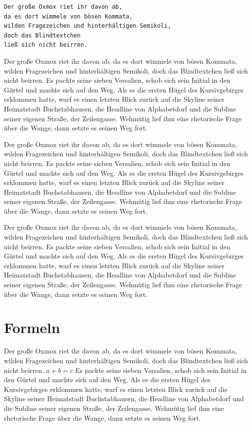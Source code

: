\documentclass[%
	12pt,%
	a4paper,%
	oneside,%
	liststotoc, idxtotoc, bibtotoc, %
	parskip=half,%
	nochapterprefix,%
	appendixprefix, %
	headings=small,%
]{scrreprt}
\newcommand{\alt}[1]{}%
\begin{document}
\begin{verbatim}
Der große Oxmox riet ihr davon ab,
da es dort wimmele von bösen Kommata,
wilden Fragezeichen und hinterhältigen Semikoli,
doch das Blindtextchen 
ließ sich nicht beirren.
\end{verbatim}

Der große Oxmox riet ihr davon ab, da es dort wimmele von bösen Kommata, wilden Fragezeichen und hinterhältigen Semikoli, doch das Blindtextchen ließ sich nicht beirren. Es packte seine sieben Versalien, schob sich sein Initial in den Gürtel und machte sich auf den Weg. Als es die ersten Hügel des Kursivgebirges erklommen hatte, warf es einen letzten Blick zurück auf die Skyline seiner Heimatstadt Buchstabhausen, die Headline von Alphabetdorf und die Subline seiner eigenen Straße, der Zeilengasse. Wehmütig lief ihm eine rhetorische Frage über die Wange, dann setzte es seinen Weg fort.

Der große Oxmox riet ihr davon ab, da es dort wimmele von bösen Kommata, wilden Fragezeichen und hinterhältigen Semikoli, doch das Blindtextchen ließ sich nicht beirren. Es packte seine sieben Versalien, schob sich sein Initial in den Gürtel und machte sich auf den Weg. Als es die ersten Hügel des Kursivgebirges erklommen hatte, warf es einen letzten Blick zurück auf die Skyline seiner Heimatstadt Buchstabhausen, die Headline von Alphabetdorf und die Subline seiner eigenen Straße, der Zeilengasse. Wehmütig lief ihm eine rhetorische Frage über die Wange, dann setzte es seinen Weg fort.

Der große Oxmox riet ihr davon ab, da es dort wimmele von bösen Kommata, wilden Fragezeichen und hinterhältigen Semikoli, doch das Blindtextchen ließ sich nicht beirren. Es packte seine sieben Versalien, schob sich sein Initial in den Gürtel und machte sich auf den Weg. Als es die ersten Hügel des Kursivgebirges erklommen hatte, warf es einen letzten Blick zurück auf die Skyline seiner Heimatstadt Buchstabhausen, die Headline von Alphabetdorf und die Subline seiner eigenen Straße, der Zeilengasse. Wehmütig lief ihm eine rhetorische Frage über die Wange, dann setzte es seinen Weg fort.

\chapter{Formeln}
Der große Oxmox riet ihr davon ab, da es dort wimmele von bösen Kommata, wilden Fragezeichen und hinterhältigen Semikoli, doch das Blindtextchen ließ sich nicht beirren. \alt{alttext}\( a + b = c\) Es packte seine sieben Versalien, schob sich sein Initial in den Gürtel und machte sich auf den Weg.  Als es die ersten Hügel des Kursivgebirges erklommen hatte, warf es einen letzten Blick zurück auf die Skyline seiner Heimatstadt Buchstabhausen, die Headline von Alphabetdorf und die Subline seiner eigenen Straße, der Zeilengasse. Wehmütig lief ihm eine rhetorische Frage über die Wange, dann setzte es seinen Weg fort.
\end{document}
